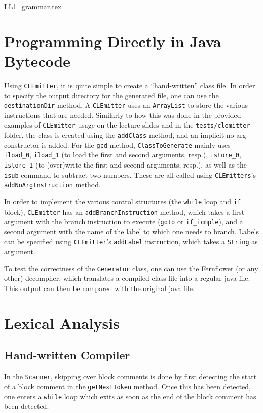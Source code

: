 \documentclass[11pt]{article}
\newcommand{\java}[1]{\texttt{#1}}
\newcommand{\jvm}[1]{\lstinline[style=myjvm]|#1|}
\begin{document}
{LL1_grammar.tex}

\section{Programming Directly in Java Bytecode}
Using \java{CLEmitter}, it is quite simple to create a ``hand-written'' class file.
In order to specify the output directory for the generated file, one can use the \java{destinationDir} method.
A \java{CLEmitter} uses an \java{ArrayList} to store the various instructions that are needed.
Similarly to how this was done in the provided examples of \java{CLEmitter} usage on the lecture slides and in the \texttt{tests/clemitter} folder, the class is created using the \java{addClass} method, and an implicit no-arg constructor is added.
For the \java{gcd} method, \java{ClassToGenerate} mainly uses \jvm{iload_0}, \jvm{iload_1} (to load the first and second arguments, resp.), \jvm{istore_0}, \jvm{istore_1} (to (over)write the first and second arguments, resp.), as well as the \jvm{isub} command to subtract two numbers.
These are all called using \java{CLEmitters}'s \java{addNoArgInstruction} method.

In order to implement the various control structures (the \java{while} loop and \java{if} block), \java{CLEmitter} has an \java{addBranchInstruction} method, which takes a first argument with the branch instruction to execute (\jvm{goto} or \jvm{if_icmple}), and a second argument with the name of the label to which one needs to branch.
Labels can be specified using \java{CLEmitter}'s \java{addLabel} instruction, which takes a \java{String} as argument.

To test the correctness of the \java{Generator} class, one can use the Fernflower (or any other) decompiler, which translates a compiled class file into a regular java file.
This output can then be compared with the original java file.

\section{Lexical Analysis}
\subsection{Hand-written Compiler}
In the \java{Scanner}, skipping over block comments is done by first detecting the start of a block comment in the \java{getNextToken} method.
Once this has been detected, one enters a \java{while} loop which exits as soon as the end of the block comment has been detected.
\end{document}
